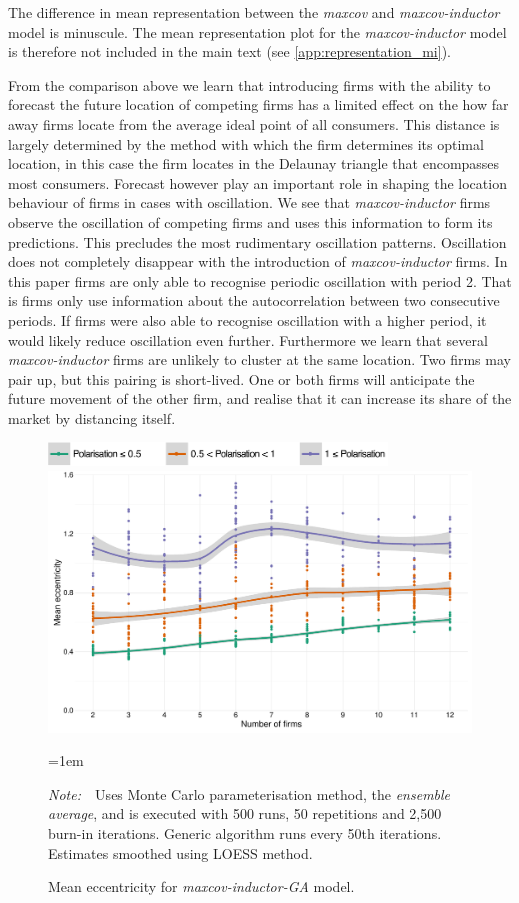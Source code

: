 \documentclass[preprint, 12pt]{elsarticle}
\newcommand{\Figtext}[1]{%
	\begin{tablenotes}[para,flushleft]
		\hangindent=1em
		\footnotesize
		\raggedright
		#1
	\end{tablenotes}
}
\newcommand{\Fignote}[1]{\Figtext{\emph{Note:~}~#1}}
\begin{document}
The difference in mean representation between the \emph{maxcov} and \emph{maxcov-inductor} model is minuscule. The mean representation plot for the \emph{maxcov-inductor} model is therefore not included in the main text (see \ref{app:representation_mi}).

From the comparison above we learn that introducing firms with the ability to forecast the future location of competing firms has a limited effect on the how far away firms locate from the average ideal point of all consumers. This distance is largely determined by the method with which the firm determines its optimal location, in this case the firm locates in the Delaunay triangle that encompasses most consumers. Forecast however play an important role in shaping the location behaviour of firms in cases with oscillation. We see that \emph{maxcov-inductor} firms observe the oscillation of competing firms and uses this information to form its predictions. This precludes the most rudimentary oscillation patterns. Oscillation does not completely disappear with the introduction of \emph{maxcov-inductor} firms. In this paper firms are only able to recognise periodic oscillation with period 2. That is firms only use information about the autocorrelation between two consecutive periods. If firms were also able to recognise oscillation with a higher period, it would likely reduce oscillation even further. Furthermore we learn that several \emph{maxcov-inductor} firms are unlikely to cluster at the same location. Two firms may pair up, but this pairing is short-lived. One or both firms will anticipate the future movement of the other firm, and realise that it can increase its share of the market by distancing itself.

\begin{figure}[ht!]
	\centering
	\includegraphics[width=90mm]{Graphics/legend_pol.pdf}
	\includegraphics[width=\textwidth]{Graphics/fig621a.pdf}
	\caption{Mean eccentricity for \emph{maxcov-inductor-GA} model.}
	\label{fig:eccentricity_miga}
	\Fignote{Uses Monte Carlo parameterisation method, the \emph{ensemble average}, and is executed with 500 runs, 50 repetitions and 2,500 burn-in iterations. Generic algorithm runs every 50th iterations. Estimates smoothed using LOESS method.}
\end{figure}
\end{document}
